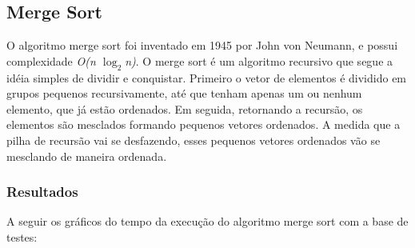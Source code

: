 \documentclass[fleqn,10pt]{SelfArx} %
\begin{document}
\subsection{Merge Sort}

O algoritmo merge sort foi inventado em 1945 por John von Neumann, e possui complexidade \emph{O(n $\log_2$n)}. 
O merge sort é um algoritmo recursivo que segue a idéia simples de dividir e conquistar. Primeiro o vetor de elementos é 
dividido em grupos pequenos recursivamente, até que tenham apenas um ou nenhum elemento, que já estão ordenados. Em 
seguida, retornando a recursão, os elementos são mesclados formando pequenos vetores ordenados. A medida que a pilha de 
recursão vai se desfazendo, esses pequenos vetores ordenados vão se mesclando de maneira ordenada.

\subsubsection*{Resultados}

A seguir os gráficos do tempo da execução do algoritmo merge sort com a base de testes:\newline

{\setlength{\parindent}{-0.5em}
}\newline

{\setlength{\parindent}{-0.5em}
}\newline

{\setlength{\parindent}{-0.5em}
}\newline
\end{document}
